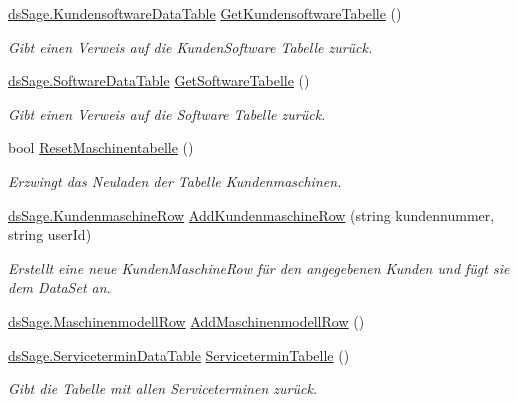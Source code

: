 \begin{DoxyCompactItemize}
\hyperlink{class_products_1_1_data_1_1ds_sage_1_1_kundensoftware_data_table}{ds\+Sage.\+Kundensoftware\+Data\+Table} \hyperlink{class_products_1_1_data_1_1_data_service_aa64d42ac50e60bd643fa62b83f63535d}{Get\+Kundensoftware\+Tabelle} ()
\begin{DoxyCompactList}\small\item\em Gibt einen Verweis auf die Kunden\+Software Tabelle zurück. \end{DoxyCompactList}\item 
\hyperlink{class_products_1_1_data_1_1ds_sage_1_1_software_data_table}{ds\+Sage.\+Software\+Data\+Table} \hyperlink{class_products_1_1_data_1_1_data_service_af2236087fa7d84bded4dbbf738269ac5}{Get\+Software\+Tabelle} ()
\begin{DoxyCompactList}\small\item\em Gibt einen Verweis auf die Software Tabelle zurück. \end{DoxyCompactList}\item 
bool \hyperlink{class_products_1_1_data_1_1_data_service_a953474b11ecf8e5e8c254e227fdab90d}{Reset\+Maschinentabelle} ()
\begin{DoxyCompactList}\small\item\em Erzwingt das Neuladen der Tabelle Kundenmaschinen. \end{DoxyCompactList}\item 
\hyperlink{class_products_1_1_data_1_1ds_sage_1_1_kundenmaschine_row}{ds\+Sage.\+Kundenmaschine\+Row} \hyperlink{class_products_1_1_data_1_1_data_service_a091789e42e8a6a5b1b0e1d2b641ce50e}{Add\+Kundenmaschine\+Row} (string kundennummer, string user\+Id)
\begin{DoxyCompactList}\small\item\em Erstellt eine neue Kunden\+Maschine\+Row für den angegebenen Kunden und fügt sie dem Data\+Set an. \end{DoxyCompactList}\item 
\hyperlink{class_products_1_1_data_1_1ds_sage_1_1_maschinenmodell_row}{ds\+Sage.\+Maschinenmodell\+Row} \hyperlink{class_products_1_1_data_1_1_data_service_a0def4883f7f19588aebf967d57dba6fc}{Add\+Maschinenmodell\+Row} ()
\item 
\hyperlink{class_products_1_1_data_1_1ds_sage_1_1_servicetermin_data_table}{ds\+Sage.\+Servicetermin\+Data\+Table} \hyperlink{class_products_1_1_data_1_1_data_service_a0caa9a3565aee45bde540433f272583d}{Servicetermin\+Tabelle} ()
\begin{DoxyCompactList}\small\item\em Gibt die Tabelle mit allen Serviceterminen zurück. \end{DoxyCompactList}\item 

\end{DoxyCompactItemize}
